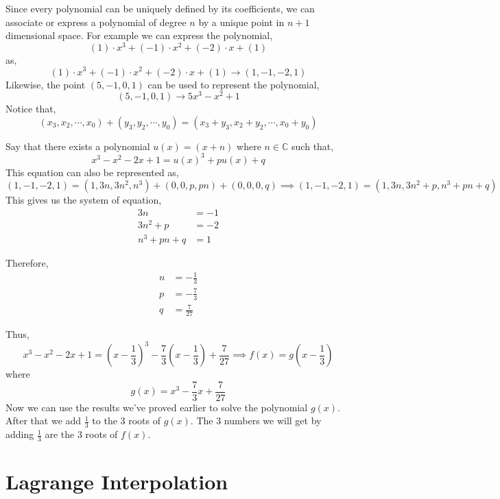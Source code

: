 Since every polynomial can be uniquely defined by its coefficients, we can associate or 
express a polynomial of degree $n$ by a unique point in $n+1$ dimensional space. 
For example we can express the polynomial,
\[
    (1) \cdot x^{3} + (-1) \cdot x^{2} + (-2) \cdot x + (1)
\]
as,
\[
    (1) \cdot x^{3} + (-1) \cdot x^{2} + (-2) \cdot x + (1) \rightarrow (1, -1, -2, 1)
\]
Likewise, the point $(5, -1, 0, 1)$ can be used to represent the polynomial,
\[
    (5, -1, 0, 1) \rightarrow 5x^{3} -x^{2} + 1
\]
Notice that,
\[
    (x_{3}, x_{2}, \cdots, x_{0}) + (y_{3}, y_{2}, \cdots, y_{0}) = (x_{3} + y_{3}, x_{2} + y_{2}, \cdots, x_{0} + y_{0})
\]

Say that there exists a polynomial $u(x) = (x+n)$ where $n \in \mathbb{C}$ such that,
\[
    x^{3} - x^{2} -2x + 1 = u(x)^{3} + pu(x) + q
\]
This equation can also be represented as,
\[
    (1, -1, -2, 1) = (1, 3n, 3n^{2}, n^{3}) + (0, 0, p, pn) + (0,0,0,q) \implies (1, -1, -2, 1) = (1, 3n, 3n^{2}+p, n^{3}+ pn + q)
\]
This gives us the system of equation,
\begin{align*}
   3n              &= -1 \\
   3n^{2} + p      &= -2 \\
    n^{3} + pn + q &= 1
\end{align*}

Therefore,
\begin{align*}
   n &= -\frac{1}{3} \\
   p &= -\frac{7}{3}\\
   q &=  \frac{7}{27}
\end{align*}

Thus,
\[
    x^{3} - x^{2} -2x +1 = \left(x - \frac{1}{3}\right)^{3} -\frac{7}{3}\left(x - \frac{1}{3}\right) +\frac{7}{27} \implies f(x) = g\left(x - \frac{1}{3}\right)
\]
where \[ g(x) = x^{3} - \frac{7}{3}x + \frac{7}{27} \]
Now we can use the results we've proved earlier to solve the polynomial $g(x)$. After that we add $\frac{1}{3}$ to the 3 roots 
of $g(x)$. The 3 numbers we will get by adding $\frac{1}{3}$ are the 3 roots of $f(x)$.

\section{Lagrange Interpolation}

